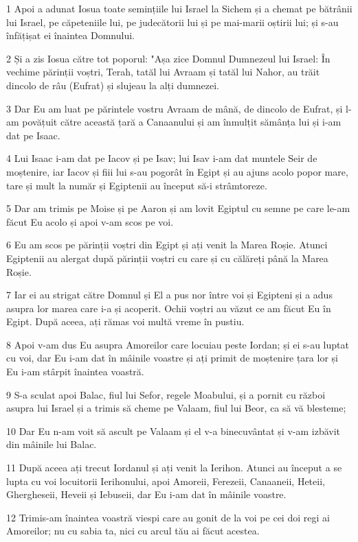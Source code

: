 \par 1 Apoi a adunat Iosua toate semințiile lui Israel la Sichem și a chemat pe bătrânii lui Israel, pe căpeteniile lui, pe judecătorii lui și pe mai-marii oștirii lui; și s-au înfățișat ei înaintea Domnului.
\par 2 Și a zis Iosua către tot poporul: "Așa zice Domnul Dumnezeul lui Israel: În vechime părinții voștri, Terah, tatăl lui Avraam și tatăl lui Nahor, au trăit dincolo de râu (Eufrat) și slujeau la alți dumnezei.
\par 3 Dar Eu am luat pe părintele vostru Avraam de mână, de dincolo de Eufrat, și l-am povățuit către această țară a Canaanului și am înmulțit sămânța lui și i-am dat pe Isaac.
\par 4 Lui Isaac i-am dat pe Iacov și pe Isav; lui Isav i-am dat muntele Seir de moștenire, iar Iacov și fiii lui s-au pogorât în Egipt și au ajuns acolo popor mare, tare și mult la număr și Egiptenii au început să-i strâmtoreze.
\par 5 Dar am trimis pe Moise și pe Aaron și am lovit Egiptul cu semne pe care le-am făcut Eu acolo și apoi v-am scos pe voi.
\par 6 Eu am scos pe părinții voștri din Egipt și ați venit la Marea Roșie. Atunci Egiptenii au alergat după părinții voștri cu care și cu călăreți până la Marea Roșie.
\par 7 Iar ei au strigat către Domnul și El a pus nor între voi și Egipteni și a adus asupra lor marea care i-a și acoperit. Ochii voștri au văzut ce am făcut Eu în Egipt. După aceea, ați rămas voi multă vreme în pustiu.
\par 8 Apoi v-am dus Eu asupra Amoreilor care locuiau peste Iordan; și ei s-au luptat cu voi, dar Eu i-am dat în mâinile voastre și ați primit de moștenire țara lor și Eu i-am stârpit înaintea voastră.
\par 9 S-a sculat apoi Balac, fiul lui Sefor, regele Moabului, și a pornit cu război asupra lui Israel și a trimis să cheme pe Valaam, fiul lui Beor, ca să vă blesteme;
\par 10 Dar Eu n-am voit să ascult pe Valaam și el v-a binecuvântat și v-am izbăvit din mâinile lui Balac.
\par 11 După aceea ați trecut Iordanul și ați venit la Ierihon. Atunci au început a se lupta cu voi locuitorii Ierihonului, apoi Amoreii, Ferezeii, Canaaneii, Heteii, Ghergheseii, Heveii și Iebuseii, dar Eu i-am dat în mâinile voastre.
\par 12 Trimis-am înaintea voastră viespi care au gonit de la voi pe cei doi regi ai Amoreilor; nu cu sabia ta, nici cu arcul tău ai făcut acestea.
